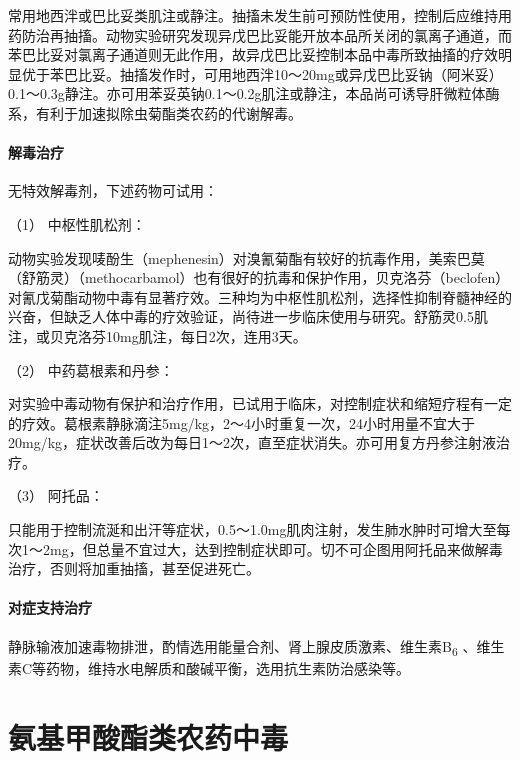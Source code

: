 常用地西泮或巴比妥类肌注或静注。抽搐未发生前可预防性使用，控制后应维持用药防治再抽搐。动物实验研究发现异戊巴比妥能开放本品所关闭的氯离子通道，而苯巴比妥对氯离子通道则无此作用，故异戊巴比妥控制本品中毒所致抽搐的疗效明显优于苯巴比妥。抽搐发作时，可用地西泮10～20mg或异戊巴比妥钠（阿米妥）0.1～0.3g静注。亦可用苯妥英钠0.1～0.2g肌注或静注，本品尚可诱导肝微粒体酶系，有利于加速拟除虫菊酯类农药的代谢解毒。

\paragraph{解毒治疗}

无特效解毒剂，下述药物可试用：

\hypertarget{text00140.htmlux5cux23CHP5-3-2-3-3-1}{}
（1） 中枢性肌松剂：

动物实验发现唛酚生（mephenesin）对溴氰菊酯有较好的抗毒作用，美索巴莫（舒筋灵）（methocarbamol）也有很好的抗毒和保护作用，贝克洛芬（beclofen）对氰戊菊酯动物中毒有显著疗效。三种均为中枢性肌松剂，选择性抑制脊髓神经的兴奋，但缺乏人体中毒的疗效验证，尚待进一步临床使用与研究。舒筋灵0.5肌注，或贝克洛芬10mg肌注，每日2次，连用3天。

\hypertarget{text00140.htmlux5cux23CHP5-3-2-3-3-2}{}
（2） 中药葛根素和丹参：

对实验中毒动物有保护和治疗作用，已试用于临床，对控制症状和缩短疗程有一定的疗效。葛根素静脉滴注5mg/kg，2～4小时重复一次，24小时用量不宜大于20mg/kg，症状改善后改为每日1～2次，直至症状消失。亦可用复方丹参注射液治疗。

\hypertarget{text00140.htmlux5cux23CHP5-3-2-3-3-3}{}
（3） 阿托品：

只能用于控制流涎和出汗等症状，0.5～1.0mg肌肉注射，发生肺水肿时可增大至每次1～2mg，但总量不宜过大，达到控制症状即可。切不可企图用阿托品来做解毒治疗，否则将加重抽搐，甚至促进死亡。

\paragraph{对症支持治疗}

静脉输液加速毒物排泄，酌情选用能量合剂、肾上腺皮质激素、维生素B\textsubscript{6}
、维生素C等药物，维持水电解质和酸碱平衡，选用抗生素防治感染等。

\protect\hypertarget{text00141.html}{}{}

\section{氨基甲酸酯类农药中毒}

